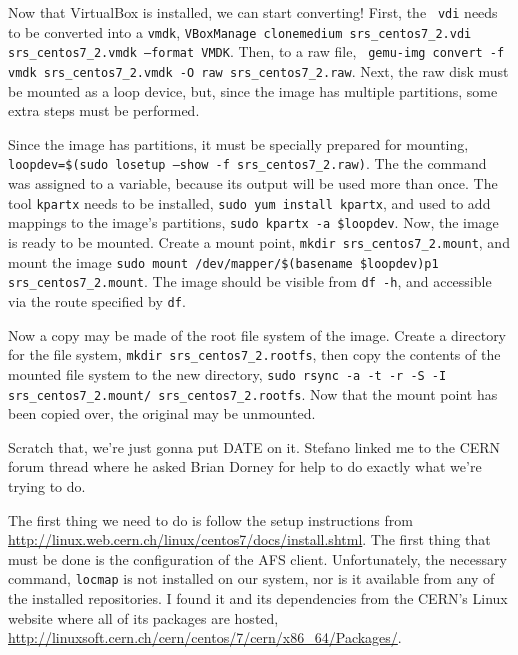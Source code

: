 \documentclass[12pt]{article}
\begin{document}
\qq Now that VirtualBox is installed, we can start converting! First, the {\tt
  vdi} needs to be converted into a {\tt vmdk}, {\tt VBoxManage clonemedium
  srs\_centos7\_2.vdi srs\_centos7\_2.vmdk --format VMDK}. Then, to a raw file, {\tt
  gemu-img convert -f vmdk srs\_centos7\_2.vmdk -O raw srs\_centos7\_2.raw}. Next,
the raw disk must be mounted as a loop device, but, since the image has multiple
partitions, some extra steps must be performed. 

\qq Since the image has partitions, it must be specially prepared for mounting,
{\tt loopdev=\$(sudo losetup --show -f srs\_centos7\_2.raw)}. The the command was
assigned to a variable, because its output will be used more than once. The tool
{\tt kpartx} needs to be installed, {\tt sudo yum install kpartx}, and used to
add mappings to the image's partitions, {\tt sudo kpartx -a \$loopdev}. Now, the
image is ready to be mounted. Create a mount point, {\tt mkdir
  srs\_centos7\_2.mount}, and mount the image {\tt sudo mount
  /dev/mapper/\$(basename \$loopdev)p1 srs\_centos7\_2.mount}. The image should be
visible from {\tt df -h}, and accessible via the route specified by {\tt df}.

\qq Now a copy may be made of the root file system of the image. Create a
directory for the file system, {\tt mkdir srs\_centos7\_2.rootfs}, then copy the
contents of the mounted file system to the new directory, {\tt sudo rsync -a -t -r -S
  -I srs\_centos7\_2.mount/ srs\_centos7\_2.rootfs}. Now that the mount point has
been copied over, the original may be unmounted. 

\qq Scratch that, we're just gonna put DATE on it. Stefano linked me to the CERN
forum thread where he asked Brian Dorney for help to do exactly what we're
trying to do. 

\qq The first thing we need to do is follow the setup instructions from
\url{http://linux.web.cern.ch/linux/centos7/docs/install.shtml}. The first thing
that must be done is the configuration of the AFS client. Unfortunately, the
necessary command, {\tt locmap} is not installed on our system, nor is it
available from any of the installed repositories. I found it and its
dependencies from the CERN's Linux website where all of its packages are hosted,
\url{http://linuxsoft.cern.ch/cern/centos/7/cern/x86_64/Packages/}.
\end{document}

